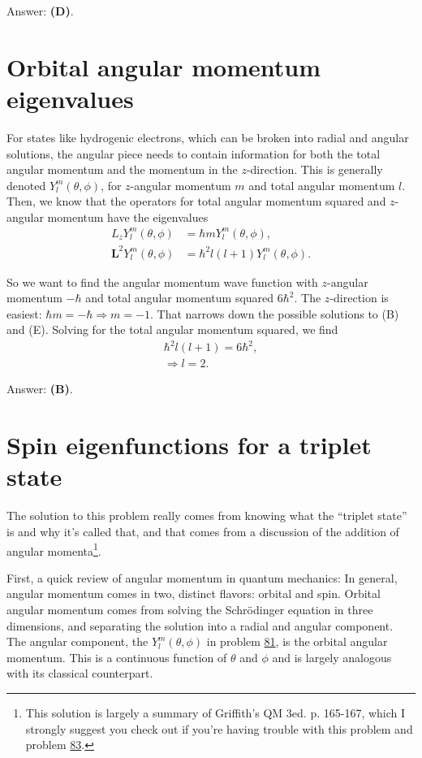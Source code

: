 \documentclass[11pt]{paper}
\newcommand{\answer}[1]{Answer: \textbf{(#1)}.}
\begin{document}
\answer{D}

\section{Orbital angular momentum eigenvalues}

For states like hydrogenic electrons, which can be broken into radial and angular solutions, the angular piece needs to contain information for both the total angular momentum and the momentum in the $z$-direction.  This is generally denoted $Y^m_l(\theta,\phi)$, for $z$-angular momentum $m$ and total angular momentum $l$.  Then, we know that the operators for total angular momentum squared and $z$-angular momentum have the eigenvalues
\begin{align}
L_zY^m_l(\theta,\phi) &= \hbar m Y^m_l(\theta,\phi),\\
\mathbf{L}^2Y^m_l(\theta,\phi) &= \hbar^2 l(l+1)Y^m_l(\theta,\phi).
\end{align}

So we want to find the angular momentum wave function with $z$-angular momentum $-\hbar$ and total angular momentum squared $6\hbar^2$.  The $z$-direction is easiest: $\hbar m = -\hbar\Rightarrow m=-1$.  That narrows down the possible solutions to (B) and (E).  Solving for the total angular momentum squared, we find
\begin{align}
\hbar^2 l(l+1) = 6\hbar^2,\\
\Rightarrow l =2.
\end{align}

\answer{B}

\section{Spin eigenfunctions for a triplet state}
The solution to this problem really comes from knowing what the ``triplet state'' is and why it's called that, and that comes from a discussion of the addition of angular momenta\footnote{This solution is largely a summary of Griffith's QM 3ed. p. 165-167, which I strongly suggest you check out if you're having trouble with this problem and problem \hyperlink{section.83}{83}.}.

First, a quick review of angular momentum in quantum mechanics:  In general, angular momentum comes in two, distinct flavors: orbital and spin.  Orbital angular momentum comes from solving the Schr\"{o}dinger equation in three dimensions, and separating the solution into a radial and angular component.  The angular component, the $Y_l^m(\theta,\phi)$ in problem \hyperlink{section.81}{81}, is the orbital angular momentum.  This is a continuous function of $\theta$ and $\phi$ and is largely analogous with its classical counterpart.
\end{document}
